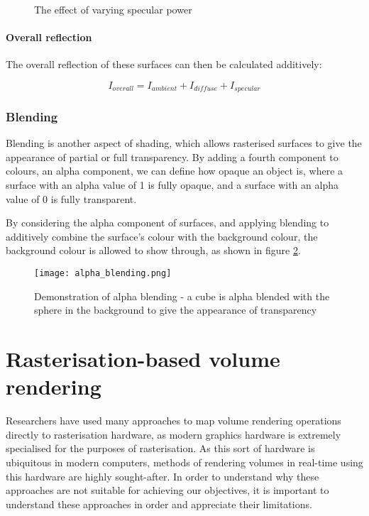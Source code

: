 \begin{figure}
	\centering
	~
	~

	\caption{The effect of varying specular power}
	\label{fig:specular-power}
\end{figure}

\paragraph{Overall reflection}
The overall reflection of these surfaces can then be calculated additively:

\[
	I_{overall} = I_{ambient} + I_{diffuse} + I_{specular}
\]

\subsubsection{Blending}
Blending is another aspect of shading, which allows rasterised surfaces to give the appearance of partial or full transparency. By adding a fourth component to colours, an alpha component, we can define how opaque an object is, where a surface with an alpha value of 1 is fully opaque, and a surface with an alpha value of 0 is fully transparent.

By considering the alpha component of surfaces, and applying blending to additively combine the surface's colour with the background colour, the background colour is allowed to show through, as shown in figure \ref{fig:alpha-blending}.

\begin{figure}
\centering
	\texttt{[image: alpha\_blending.png]}
	\caption{Demonstration of alpha blending - a cube is alpha blended with the sphere in the background to give the appearance of transparency}
	\label{fig:alpha-blending}
\end{figure}

\section{Rasterisation-based volume rendering}
Researchers have used many approaches to map volume rendering operations directly to rasterisation hardware, as modern graphics hardware is extremely specialised for the purposes of rasterisation. As this sort of hardware is ubiquitous in modern computers, methods of rendering volumes in real-time using this hardware are highly sought-after. In order to understand why these approaches are not suitable for achieving our objectives, it is important to understand these approaches in order and appreciate their limitations.

